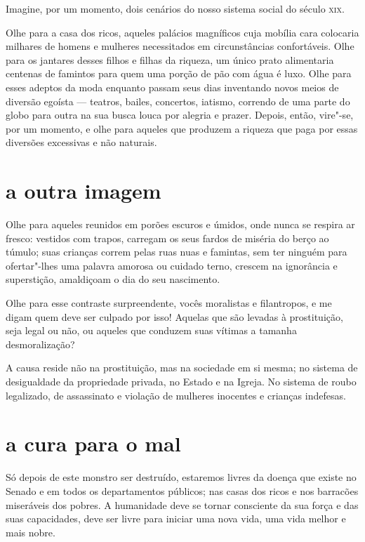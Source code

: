 Imagine, por um momento, dois cenários do nosso sistema social do século \textsc{xix}.

Olhe para a casa dos ricos, aqueles palácios magníficos cuja mobília
cara colocaria milhares de homens e mulheres necessitados em
circunstâncias confortáveis. Olhe para os jantares desses filhos e
filhas da riqueza, um único prato alimentaria centenas de famintos para
quem uma porção de pão com água é luxo. Olhe para esses adeptos da moda
enquanto passam seus dias inventando novos meios de diversão egoísta --- teatros, bailes, concertos, iatismo, correndo de uma parte do globo para
outra na sua busca louca por alegria e prazer. Depois, então, vire"-se,
por um momento, e olhe para aqueles que produzem a riqueza que paga por
essas diversões excessivas e não naturais.

\section{a outra imagem}

Olhe para aqueles reunidos em porões escuros e úmidos, onde nunca se respira
ar fresco: vestidos com trapos, carregam os seus fardos de miséria do
berço ao túmulo; suas crianças correm pelas ruas nuas e famintas, 
sem ter ninguém para ofertar"-lhes uma palavra amorosa ou cuidado terno, 
crescem na ignorância e superstição, amaldiçoam o dia do seu nascimento.

Olhe para esse contraste surpreendente, vocês moralistas e filantropos,
e me digam quem deve ser culpado por isso! Aquelas que são levadas à
prostituição, seja legal ou não, ou aqueles que conduzem suas vítimas a
tamanha desmoralização?

A causa reside não na prostituição, mas na sociedade em si mesma; no
sistema de desigualdade da propriedade privada, no Estado e na Igreja. No
sistema de roubo legalizado, de assassinato e violação de mulheres
inocentes e crianças indefesas.

\section{a cura para o mal}

Só depois de este monstro ser destruído, estaremos livres da doença que
existe no Senado e em todos os departamentos públicos; nas casas dos
ricos e nos barracões miseráveis dos pobres. A humanidade deve
se tornar consciente da sua força e das suas capacidades, deve ser livre
para iniciar uma nova vida, uma vida melhor e mais nobre.

